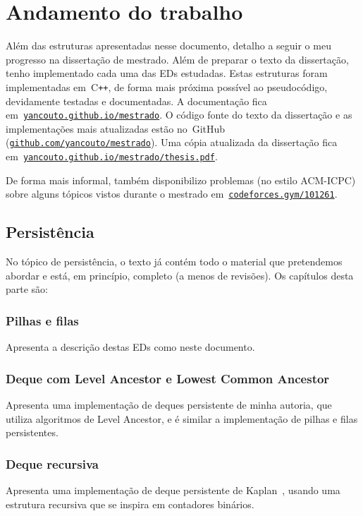 \documentclass[quali.tex]{subfile}
\begin{document}
\section{Andamento do trabalho} \label{sec:progresso}

Além das estruturas apresentadas nesse documento, detalho a seguir o meu progresso na dissertação de mestrado. Além de preparar o texto da dissertação, tenho implementado cada uma das EDs estudadas. Estas estruturas foram implementadas em~C\texttt{++}, de forma mais próxima possível ao pseudocódigo, devidamente testadas e documentadas. A documentação fica em~\mbox{\href{https://yancouto.github.io/mestrado/}{\texttt{yancouto.github.io/mestrado}}}. O código fonte do texto da dissertação e as implementações mais atualizadas estão no~GitHub (\href{https://github.com/yancouto/mestrado}{\texttt{github.com/yancouto/mestrado}}). Uma cópia atualizada da dissertação fica em\mbox{~\href{https://yancouto.github.io/mestrado/thesis.pdf}{\texttt{yancouto.github.io/mestrado/thesis.pdf}}}.



De forma mais informal, também disponibilizo problemas (no estilo ACM-ICPC) sobre alguns tópicos vistos durante o mestrado em~\mbox{\href{http://codeforces.com/gym/101261}{\texttt{codeforces.gym/101261}}}.

\subsection{Persistência}

No tópico de persistência, o texto já contém todo o material que pretendemos abordar e está, em princípio, completo (a menos de revisões). Os capítulos desta parte são:

\subsubsection*{Pilhas e filas}
	Apresenta a descrição destas EDs como neste documento.
\subsubsection*{Deque com Level Ancestor e Lowest Common Ancestor}
	Apresenta uma implementação de deques persistente de minha autoria, que utiliza algoritmos de Level Ancestor, e é similar a implementação de pilhas e filas persistentes.
\subsubsection*{Deque recursiva}
	Apresenta uma implementação de deque persistente de Kaplan~\cite{Kaplan2001}, usando uma estrutura recursiva que se inspira em contadores binários.
\end{document}
